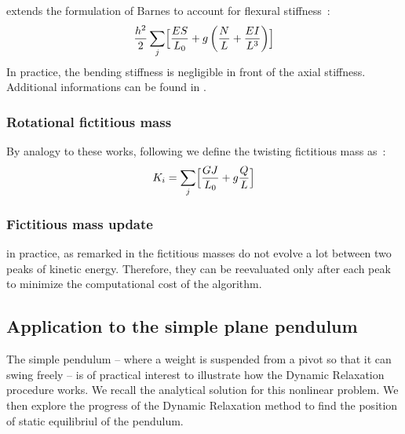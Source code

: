  extends the formulation of Barnes to account for flexural stiffness~:
\begin{equation}
	\frac{h^2}{2} \sum_j \Bigl[\frac{ES}{L_0} + g \left(\frac{N}{L} + \frac{EI}{L^3} \right) \Bigr]
\end{equation}
In practice, the bending stiffness is negligible in front of the axial stiffness. Additional informations can be found in \cite{Lewis2003,Rodriguez2011a}.

\subsubsection{Rotational fictitious mass}
By analogy to these works, following \cite{Lefevre2017} we define the twisting fictitious mass as~:
\begin{equation}
	K_i = \sum_j \Bigl[\frac{GJ}{L_0} + g \frac{Q}{L} \Bigr]
\end{equation}

\subsubsection{Fictitious mass update}
in practice, as remarked in \cite{Douthe2007} the fictitious masses do not evolve a lot between two peaks of kinetic energy. Therefore, they can be reevaluated only after each peak to minimize the computational cost of the algorithm.

\subsection{Application to the simple plane pendulum}
The simple pendulum -- where a weight is suspended from a pivot so that it can swing freely -- is of practical interest to illustrate how the Dynamic Relaxation procedure works. We recall the analytical solution for this nonlinear problem. We then explore the progress of the Dynamic Relaxation method to find the position of static equilibriul of the pendulum.

